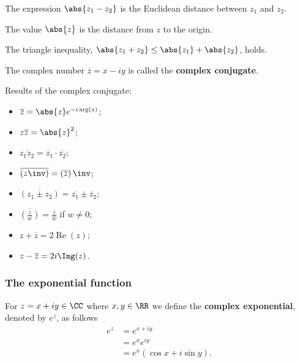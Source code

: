 \documentclass[12pt, a4paper]{article}
\DeclareMathOperator{\R}{Re}
\begin{document}
\begin{definition}
    The expression \(\abs{z_1-z_2}\) is the Euclidean distance between \(z_1\) and \(z_2\). 
\end{definition}

\begin{corollary}
    The value \(\abs{z}\) is the distance from \(z\) to the origin.
\end{corollary}

\begin{mdremark}
    The triangle inequality, \(\abs{z_1+z_2} \leq \abs{z_1} + \abs{z_2}\), holds.
\end{mdremark}

\begin{definition}
    The complex number \(\overline{z} = x-iy\) is called the \textbf{complex conjugate}.
\end{definition}

\begin{theorem}
    Results of the complex conjugate:
    \begin{itemize}
        \item \(\overline{z} = \abs{z} e^{-i \arg(z)}\);
        \item \(z\overline{z}= \abs{z}^2\);
        \item \(\overline{z_1z_2} = \overline{z_1} \cdot \overline{z_2}\);
        \item \(\overline{\left(z\inv \right)} = \left( \overline{z} \right)\inv\);
        \item \(\overline{\left( z_1 \pm z_2 \right)} = \overline{z_1} \pm\overline{z_2}\);
        \item \(\overline{\left( \frac{z}{w} \right)} = \frac{\overline{z}}{\overline{w}}\) if \(w \neq 0\);
        \item \(z+\overline{z} = 2 \R(z)\);
        \item \(z-\overline{z} = 2i \Img(z)\).
    \end{itemize}
\end{theorem}

\subsubsection{The exponential function}

\begin{definition}
    For \(z = x+iy \in \CC\) where \(x,y \in \RR\) we define the \textbf{complex exponential}, denoted by \(e^z\), as follows 
    \[\begin{aligned}
        e^z &= e^{x+iy} \\
        &= e^x e^{iy} \\
        &= e^x (\cos x +i \sin y).
    \end{aligned}\]
\end{definition}
\end{document}
